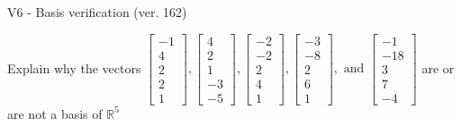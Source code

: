 \begin{exercise}
  \begin{exerciseTitle}V6 - Basis verification (ver. 162)\end{exerciseTitle}
  \begin{exerciseStatement}
    Explain why the vectors \(\left[\begin{array}{r}
-1 \\
4 \\
2 \\
2 \\
1
\end{array}\right] , \left[\begin{array}{r}
4 \\
2 \\
1 \\
-3 \\
-5
\end{array}\right] , \left[\begin{array}{r}
-2 \\
-2 \\
2 \\
4 \\
1
\end{array}\right] , \left[\begin{array}{r}
-3 \\
-8 \\
2 \\
6 \\
1
\end{array}\right] , \text{ and } \left[\begin{array}{r}
-1 \\
-18 \\
3 \\
7 \\
-4
\end{array}\right]\) are or are not a basis of \(\mathbb{R}^5\)	



\end{exerciseStatement}
\end{exercise}

